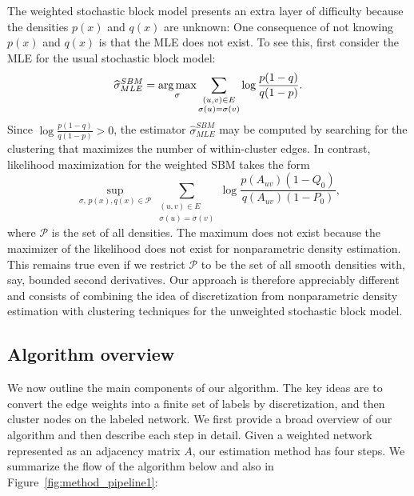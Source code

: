 \documentclass{article}
\begin{document}
The weighted stochastic block model presents an extra layer of difficulty because the densities $p(x)$ and $q(x)$ are unknown: One consequence of not knowing $p(x)$ and $q(x)$ is that the MLE does not exist. To see this, first consider the MLE for the usual stochastic block model:
\begin{equation*}
\widehat{\sigma}^{SBM}_{MLE} = \mathop{\text{\rm arg\,max}}_{\sigma}  \sum_{\substack{ (u,v) \in E \\ \sigma(u) = \sigma(v)}} \log \frac{p(1-q)}{q(1-p)}.
\end{equation*}
Since $\log \frac{p (1-q)}{q (1-p)} > 0$, the estimator $\hat{\sigma}^{SBM}_{MLE}$ may be computed by searching for the clustering that maximizes the number of within-cluster edges. In contrast, likelihood maximization for the weighted SBM takes the form
\[
\sup_{\sigma,\, p(x), q(x) \in \mathcal{P} } \sum_{\substack{ (u,v) \in E \\ \sigma(u) = \sigma(v)}} \log \frac{p(A_{uv}) (1-Q_0)}{q(A_{uv}) (1-P_0)},
\]
where $\mathcal{P}$ is the set of all densities. The maximum does not exist because the maximizer of the likelihood does not exist for nonparametric density estimation. This remains true even if we restrict $\mathcal{P}$ to be the set of all smooth densities with, say, bounded second derivatives. Our approach is therefore appreciably different and consists of combining the idea of discretization from nonparametric density estimation with clustering techniques for the unweighted stochastic block model. 

\subsection{Algorithm overview}

We now outline the main components of our algorithm. The key ideas are to convert the edge weights into a finite set of labels by discretization, and then cluster nodes on the labeled network. We first provide a broad overview of our algorithm and then describe each step in detail. Given a weighted network represented as an adjacency matrix $A$, our estimation method has four steps. We summarize the flow of the algorithm below and also in Figure~\ref{fig:method_pipeline1}:
\end{document}
